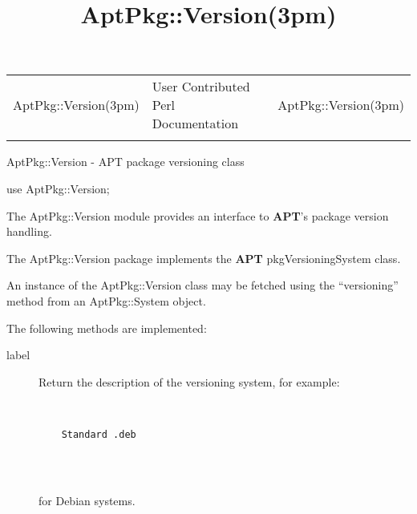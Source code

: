 \documentclass[]{article}
\title{AptPkg::Version(3pm)}
\author{}
\date{}
\let\realtextbf=\textbf
\renewcommand{\textbf}[1]{\textcolor{boldcolor}{\realtextbf{#1}}}
\begin{document}
\maketitle

\begin{longtable}[c]{@{}lll@{}}
\toprule\addlinespace
AptPkg::Version(3pm) & User Contributed Perl Documentation &
AptPkg::Version(3pm)
\\\addlinespace
\bottomrule
\end{longtable}


AptPkg::Version - APT package versioning class


use AptPkg::Version;


The AptPkg::Version module provides an interface to \textbf{APT}'s
package version handling.


The AptPkg::Version package implements the \textbf{APT}
pkgVersioningSystem class.

An instance of the AptPkg::Version class may be fetched using the
``versioning'' method from an AptPkg::System object.

The following methods are implemented:

\begin{description}
\item[label]
Return the description of the versioning system, for example:

~

\begin{verbatim}
    Standard .deb
    
\end{verbatim}

~

for Debian systems.
\end{description}
\end{document}

